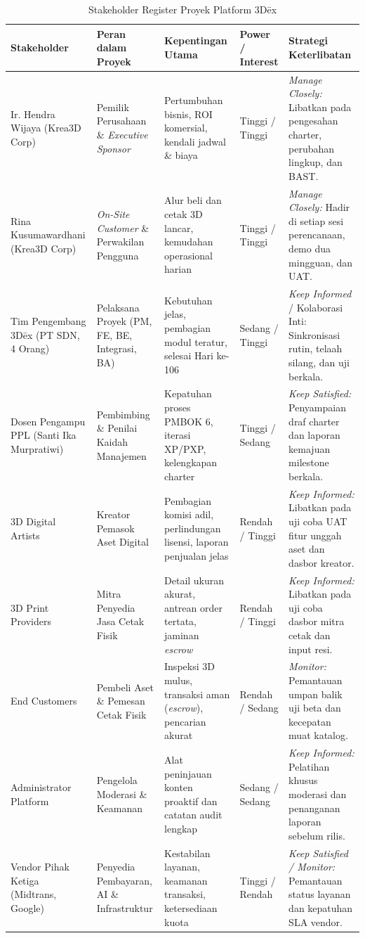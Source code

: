\documentclass[11pt,a4paper]{article}
\newcommand{\thdr}[1]{\centering\arraybackslash\textbf{#1}}
\begin{document}
\begin{table}[H]
\centering
\caption{Stakeholder Register Proyek Platform 3D\={e}x}
\footnotesize
\begin{tabularx}{\textwidth}{| L{2.7cm} | L{2.7cm} | L{3.6cm} | C{1.9cm} | Y |}
\hline
{} \thdr{Stakeholder} & \thdr{Peran dalam Proyek} & \thdr{Kepentingan Utama} & \thdr{Power / Interest} & \thdr{Strategi Keterlibatan} \\
\hline
Ir. Hendra Wijaya (Krea3D Corp) & Pemilik Perusahaan \& \textit{Executive Sponsor} & Pertumbuhan bisnis, ROI komersial, kendali jadwal \& biaya & Tinggi / Tinggi & \textit{Manage Closely:} Libatkan pada pengesahan charter, perubahan lingkup, dan BAST. \\
\hline
Rina Kusumawardhani (Krea3D Corp) & \textit{On-Site Customer} \& Perwakilan Pengguna & Alur beli dan cetak 3D lancar, kemudahan operasional harian & Tinggi / Tinggi & \textit{Manage Closely:} Hadir di setiap sesi perencanaan, demo dua mingguan, dan UAT. \\
\hline
Tim Pengembang 3D\={e}x (PT SDN, 4 Orang) & Pelaksana Proyek (PM, FE, BE, Integrasi, BA) & Kebutuhan jelas, pembagian modul teratur, selesai Hari ke-106 & Sedang / Tinggi & \textit{Keep Informed} / Kolaborasi Inti: Sinkronisasi rutin, telaah silang, dan uji berkala. \\
\hline
Dosen Pengampu PPL (Santi Ika Murpratiwi) & Pembimbing \& Penilai Kaidah Manajemen & Kepatuhan proses PMBOK 6, iterasi XP/PXP, kelengkapan charter & Tinggi / Sedang & \textit{Keep Satisfied:} Penyampaian draf charter dan laporan kemajuan milestone berkala. \\
\hline
3D Digital Artists & Kreator Pemasok Aset Digital & Pembagian komisi adil, perlindungan lisensi, laporan penjualan jelas & Rendah / Tinggi & \textit{Keep Informed:} Libatkan pada uji coba UAT fitur unggah aset dan dasbor kreator. \\
\hline
3D Print Providers & Mitra Penyedia Jasa Cetak Fisik & Detail ukuran akurat, antrean order tertata, jaminan \textit{escrow} & Rendah / Tinggi & \textit{Keep Informed:} Libatkan pada uji coba dasbor mitra cetak dan input resi. \\
\hline
End Customers & Pembeli Aset \& Pemesan Cetak Fisik & Inspeksi 3D mulus, transaksi aman (\textit{escrow}), pencarian akurat & Rendah / Sedang & \textit{Monitor:} Pemantauan umpan balik uji beta dan kecepatan muat katalog. \\
\hline
Administrator Platform & Pengelola Moderasi \& Keamanan & Alat peninjauan konten proaktif dan catatan audit lengkap & Sedang / Sedang & \textit{Keep Informed:} Pelatihan khusus moderasi dan penanganan laporan sebelum rilis. \\
\hline
Vendor Pihak Ketiga (Midtrans, Google) & Penyedia Pembayaran, AI \& Infrastruktur & Kestabilan layanan, keamanan transaksi, ketersediaan kuota & Tinggi / Rendah & \textit{Keep Satisfied / Monitor:} Pemantauan status layanan dan kepatuhan SLA vendor. \\
\hline
\end{tabularx}
\end{table}
\end{document}
